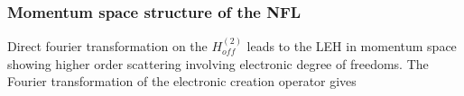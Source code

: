 \documentclass[reprint,prb,superscriptaddress]{revtex4-1}
\begin{document}
\subsubsection{Momentum space structure of the NFL}
Direct fourier transformation on the $H^{(2)}_{off}$ leads to the LEH in momentum space showing higher order scattering involving electronic degree of freedoms.
The Fourier transformation of the electronic creation operator gives
%
\end{document}
